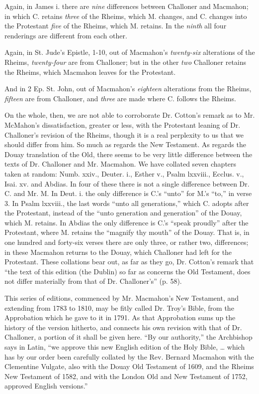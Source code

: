 Again, in James i. there are \emph{nine} differences between
Challoner and Macmahon; in which C. retains \emph{three} of the Rheims,
which M. changes, and C. changes into the Protestant \emph{five} of
the Rheims, which M. retains. In the \emph{ninth} all four renderings
are different from each other.

Again, in St. Jude's Epistle, 1-10, out of Macmahon's \emph{twenty-six}
alterations of the Rheims, \emph{twenty-four} are from Challoner; but
in the other \emph{two} Challoner retains the Rheims, which Macmahon
leaves for the Protestant.

And in 2 Ep. St. John, out of Macmahon's \emph{eighteen}
alterations from the Rheims, \emph{fifteen} are from Challoner, and \emph{three}
are made where C. follows the Rheims.

On the whole, then, we are not able to corroborate Dr. Cotton's
remark as to Mr. McMahon's dissatisfaction, greater or less, with the
Protestant leaning of Dr. Challoner's revision of the Rheims, though
it is a real perplexity to us that we should differ from him. So
much as regards the New Testament. As regards the Douay translation of
the Old, there seems to be very little difference between the texts of
Dr. Challoner and Mr. Macmahon. We have collated seven chapters taken
at random: Numb. xxiv., Deuter. i., Esther v., Psalm lxxviii., Ecclus.
v., Isai. xv. and Abdias. In four of these there is not a single
difference between Dr. C. and Mr. M. In Deut. i. the only difference
is C.'s ``unto'' for M.'s ``to,'' in verse 3. In Psalm
lxxviii., the last words ``unto all generations,'' which C.
adopts after the Protestant, instead of the ``unto generation and
generation'' of the Douay, which M. retains. In Abdias the only
difference is C.'s ``speak proudly'' after the Protestant,
where M. retains the ``magnify thy mouth'' of the Douay. That
is, in one hundred and forty-six verses there are only three, or
rather two, differences; in these Macmahon returns to the Douay, which
Challoner had left for the Protestant. These collations bear out, as
far as they go, Dr. Cotton's remark that ``the text of this
edition (the Dublin) so far as concerns the Old Testament, does not
differ materially from that of Dr. Challoner's'' (p. 58).

This series of editions, commenced by Mr. Macmahon's New Testament,
and extending from 1783 to 1810, may be fitly called Dr. Troy's Bible,
from the Approbation which he gave to it in 1791. As that Approbation
sums up the history of the version hitherto, and connects his own
revision with that of Dr. Challoner, a portion of it shall be given
here. ``By our authority,'' the Archbishop says in
Latin, ``we approve this new English edition of the Holy Bible,
… which has by our order been carefully collated by the Rev. Bernard
Macmahon with the Clementine Vulgate, also with the Douay Old
Testament of 1609, and the Rheims New Testament of 1582, and with the
London Old and New Testament of 1752, approved English versions.''

